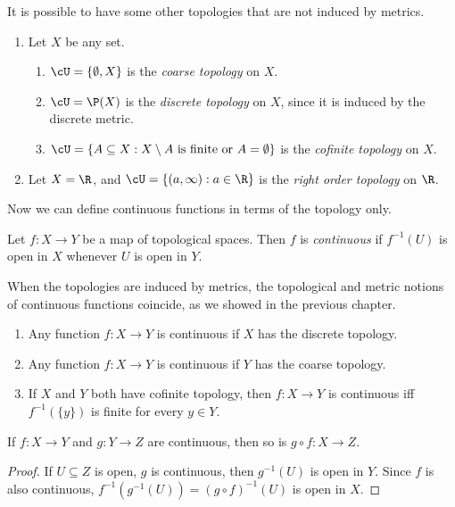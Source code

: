 \documentclass[a4paper]{article}
\begin{document}
It is possible to have some other topologies that are not induced by metrics.
\begin{eg}\leavevmode
  \begin{enumerate}
    \item Let $X$ be any set.
      \begin{enumerate}
        \item $\cU = \{\emptyset, X\}$ is the \emph{coarse topology} on $X$.
        \item $\cU = \P(X)$ is the \emph{discrete topology} on $X$, since it is induced by the discrete metric.
        \item $\cU = \{A\subseteq X: X\setminus A\text{ is finite or } A = \emptyset\}$ is the \emph{cofinite topology} on $X$.
      \end{enumerate}
    \item Let $X = \R$, and $\cU = \{(a, \infty): a\in \R\}$ is the \emph{right order topology} on $\R$.
  \end{enumerate}
\end{eg}

Now we can define continuous functions in terms of the topology only.
\begin{defi}
  Let $f: X\to Y$ be a map of topological spaces. Then $f$ is \emph{continuous} if $f^{-1}(U)$ is open in $X$ whenever $U$ is open in $Y$.
\end{defi}
When the topologies are induced by metrics, the topological and metric notions of continuous functions coincide, as we showed in the previous chapter.

\begin{eg}\leavevmode
  \begin{enumerate}
    \item Any function $f: X\to Y$ is continuous if $X$ has the discrete topology.
    \item Any function $f: X\to Y$ is continuous if $Y$ has the coarse topology.
    \item If $X$ and $Y$ both have cofinite topology, then $f: X\to Y$ is continuous iff $f^{-1}(\{y\})$ is finite for every $y\in Y$.
  \end{enumerate}
\end{eg}

\begin{lemma}
  If $f: X\to Y$ and $g: Y\to Z$ are continuous, then so is $g\circ f: X\to Z$.
\end{lemma}

\begin{proof}
  If $U\subseteq Z$ is open, $g$ is continuous, then $g^{-1}(U)$ is open in $Y$. Since $f$ is also continuous, $f^{-1}(g^{-1}(U)) = (g\circ f)^{-1}(U)$ is open in $X$.
\end{proof}
\end{document}
